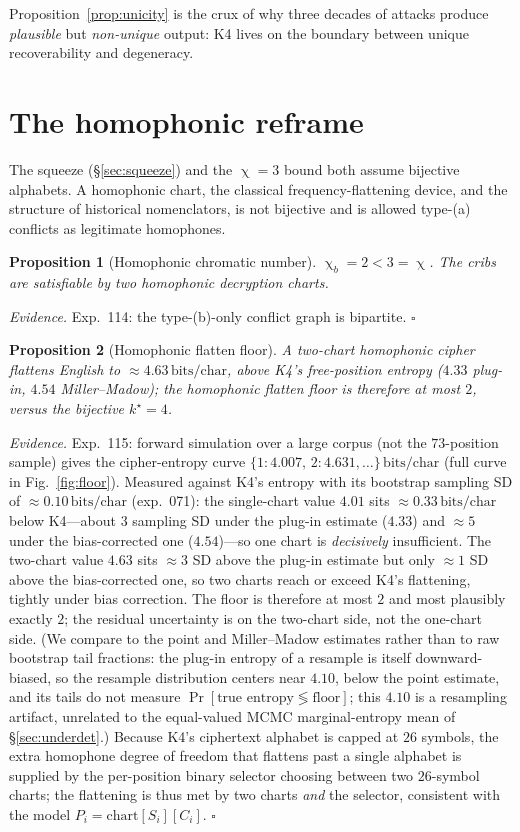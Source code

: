 \documentclass[11pt]{article}
\theoremstyle{plain}
\newtheorem{proposition}{Proposition}
\theoremstyle{definition}
\newcommand{\K}{\textsf{K4}}
\newcommand{\bits}{\,\text{bits/char}}
\DeclareMathOperator{\chrom}{\chi}
\begin{document}
\noindent
Proposition~\ref{prop:unicity} is the crux of why three decades of attacks produce
\emph{plausible} but \emph{non-unique} output: \K{} lives on the boundary between
unique recoverability and degeneracy.

\section{The homophonic reframe}\label{sec:homophonic}

The squeeze (\S\ref{sec:squeeze}) and the $\chrom=3$ bound both assume bijective
alphabets. A homophonic chart, the classical frequency-flattening device, and the
structure of historical nomenclators, is not bijective and is allowed type-(a)
conflicts as legitimate homophones.

\begin{proposition}[Homophonic chromatic number]\label{prop:chib}
$\chrom_b = 2 < 3 = \chrom$. The cribs are satisfiable by two homophonic decryption
charts.
\end{proposition}
\noindent\emph{Evidence.} Exp.~114: the type-(b)-only conflict graph is bipartite.
\hfill$\square$

\begin{proposition}[Homophonic flatten floor]\label{prop:floor}
A two-chart homophonic cipher flattens English to $\approx4.63\bits$, above \K{}'s
free-position entropy ($4.33$ plug-in, $4.54$ Miller--Madow); the homophonic flatten
floor is therefore at most $2$, versus the bijective $k^\star=4$.
\end{proposition}
\noindent\emph{Evidence.} Exp.~115: forward simulation over a large corpus (not the
$73$-position sample) gives the cipher-entropy curve
$\{1{:}4.007,\,2{:}4.631,\dots\}\bits$ (full curve in Fig.~\ref{fig:floor}). Measured
against \K{}'s entropy with its bootstrap sampling SD of ${\approx}0.10\bits$
(exp.~071): the single-chart value $4.01$ sits ${\approx}0.33\bits$ below \K{}---about
$3$ sampling SD under the plug-in estimate ($4.33$) and ${\approx}5$ under the
bias-corrected one ($4.54$)---so one chart is \emph{decisively} insufficient. The
two-chart value $4.63$ sits ${\approx}3$ SD above the plug-in estimate but only
${\approx}1$ SD above the bias-corrected one, so two charts reach or exceed \K{}'s
flattening, tightly under bias correction. The floor is therefore at most $2$ and most
plausibly exactly $2$; the residual uncertainty is on the two-chart side, not the
one-chart side. (We compare to the point and Miller--Madow estimates rather than to
raw bootstrap tail fractions: the plug-in entropy of a resample is itself
downward-biased, so the resample distribution centers near $4.10$, below the point
estimate, and its tails do not measure $\Pr[\text{true entropy}\lessgtr\text{floor}]$;
this $4.10$ is a resampling artifact, unrelated to the equal-valued MCMC
marginal-entropy mean of \S\ref{sec:underdet}.) Because \K{}'s ciphertext alphabet is
capped at $26$ symbols, the extra homophone degree of freedom that flattens past a
single alphabet is supplied by the per-position binary selector choosing between two
$26$-symbol charts; the flattening is thus met by two charts \emph{and} the selector,
consistent with the model $P_i=\mathrm{chart}[S_i][C_i]$. \hfill$\square$
\end{document}

